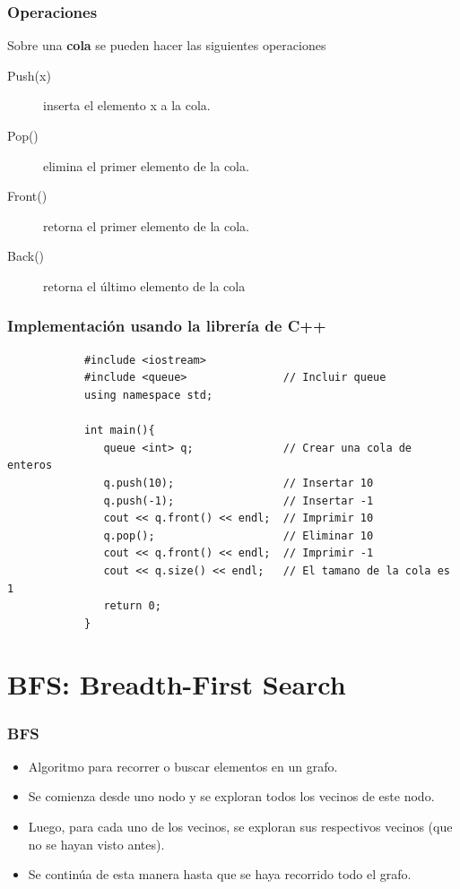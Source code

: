 \documentclass{beamer}
\begin{document}
	\begin{frame}
		\frametitle{Operaciones}
		Sobre una \textbf{cola} se pueden hacer las siguientes operaciones
		\begin{description}
			\item[Push(x)] inserta el elemento x a la cola.
			\item[Pop()] elimina el primer elemento de la cola.
			\item[Front()] retorna el primer elemento de la cola.
			\item[Back()] retorna el último elemento de la cola
		\end{description}
	\end{frame}
	
	\begin{frame}[fragile]
		\frametitle{Implementación usando la librería de C++}
		\begin{lstlisting}
			#include <iostream>
			#include <queue>               // Incluir queue
			using namespace std;

			int main(){
			   queue <int> q;              // Crear una cola de enteros
			   q.push(10);                 // Insertar 10
			   q.push(-1);                 // Insertar -1
			   cout << q.front() << endl;  // Imprimir 10
			   q.pop();                    // Eliminar 10
			   cout << q.front() << endl;  // Imprimir -1
			   cout << q.size() << endl;   // El tamano de la cola es 1
			   return 0;
			}
		\end{lstlisting}
	\end{frame}
	
\section{BFS: Breadth-First Search}
	\begin{frame}
		\frametitle{BFS}
		\begin{itemize}
			\item Algoritmo para recorrer o buscar elementos en un grafo.
			\item Se comienza desde uno nodo y se exploran todos los vecinos de este nodo.
			\item Luego, para cada uno de los vecinos, se exploran sus respectivos vecinos (que no se hayan visto antes).
			\item Se continúa de esta manera hasta que se haya recorrido todo el grafo.
		\end{itemize}
	\end{frame}
	
\end{document}
